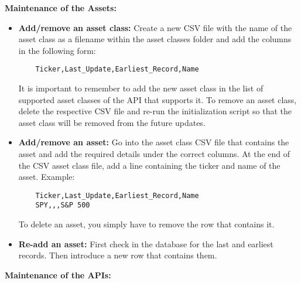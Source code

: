 \documentclass[main.tex]{subfiles}
\begin{document}
\textbf{Maintenance of the Assets:}

\begin{itemize}
    \item \textbf{Add/remove an asset class: }Create a new CSV file with the name of the asset class as a filename within the asset classes folder and add the columns in the following form:\newline
    \begin{lstlisting}
    Ticker,Last_Update,Earliest_Record,Name
    \end{lstlisting}
    It is important to remember to add the new asset class in the list of supported asset classes of the API that supports it.\newline
    To remove an asset class, delete the respective CSV file and re-run the initialization script so that the asset class will be removed from the future updates. 
    \item \textbf{Add/remove an asset: }Go into the asset class CSV file that contains the asset and add the required details under the correct columns.
    At the end of the CSV asset class file, add a line containing the ticker and name of the asset.\newline
    Example:
    \begin{lstlisting}
    Ticker,Last_Update,Earliest_Record,Name
    SPY,,,S&P 500
    \end{lstlisting}
    To delete an asset, you simply have to remove the row that contains it.
    
    \item \textbf{Re-add an asset: } First check in the database for the last and earliest records. Then introduce a new row that contains them.
\end{itemize}
\textbf{Maintenance of the APIs:}
\end{document}
